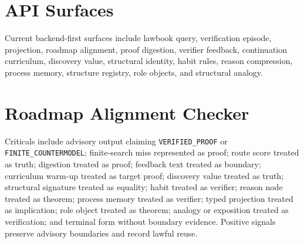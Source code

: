 \documentclass[11pt,a4paper]{article}
\begin{document}
\section{API Surfaces}
Current backend-first surfaces include lawbook query, verification episode, projection, roadmap alignment, proof digestion, verifier feedback, continuation curriculum, discovery value, structural identity, habit rules, reason compression, process memory, structure registry, role objects, and structural analogy.

\section{Roadmap Alignment Checker}
Criticals include advisory output claiming \texttt{VERIFIED\_PROOF} or \texttt{FINITE\_COUNTERMODEL}; finite-search miss represented as proof; route score treated as truth; digestion treated as proof; feedback text treated as boundary; curriculum warm-up treated as target proof; discovery value treated as truth; structural signature treated as equality; habit treated as verifier; reason node treated as theorem; process memory treated as verifier; typed projection treated as implication; role object treated as theorem; analogy or exposition treated as verification; and terminal form without boundary evidence. Positive signals preserve advisory boundaries and record lawful reuse.
\end{document}
